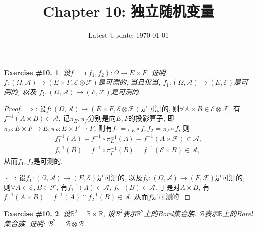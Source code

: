 \documentclass[UTF8, a4paper]{article}
\title{Chapter 10: 独立随机变量}
\author{}
\date{Latest Update: \today}
\newtheorem{exercise}{Exercise \#10.}
\begin{document}
\maketitle

\begin{framed}
\begin{exercise}
设\(f = (f_1, f_2): \Omega \to E \times F\).
证明\(f: (\Omega, \mathcal{A}) \to (E\times F, \mathcal{E}\otimes \mathcal{F})\)是可测的, 
当且仅当, \(f_1: (\Omega, \mathcal{A}) \to (E, \mathcal{E})\)是可测的, 以及
\(f_2: (\Omega, \mathcal{A}) \to (F, \mathcal{F})\)是可测的.
\end{exercise}
\end{framed}

\begin{proof}
\(\Rightarrow\): 设\(f:  (\Omega, \mathcal{A}) \to (E\times F, \mathcal{E}\otimes \mathcal{F})\)是可测的, 
则\(\forall A\times B \in \mathcal{E} \otimes \mathcal{F}\), 有\(f^{-1}(A\times B) \in \mathcal{A}\).
记\(\pi_E, \pi_F\)分别是向\(E, F\)的投影算子, 即\(\pi_E: E\times F \to E, \pi_F: E\times F \to F\), 
则有\(f_1 = \pi_E \circ f, f_2 = \pi_F \circ f\), 则
$$
\begin{gathered}
    f_1^{-1}(A) = f^{-1} \circ \pi_E^{-1}(A) = f^{-1} (A \times \mathcal{F}) \in \mathcal{A}, \\
    f_2^{-1}(B) = f^{-1} \circ \pi_F^{-1}(B) = f^{-1} (\mathcal{E} \times B) \in \mathcal{A},
\end{gathered}
$$
从而\(f_1, f_2\)是可测的.

\(\Leftarrow\): 设\(f_1: (\Omega, \mathcal{A}) \to (E, \mathcal{E})\)是可测的, 以及\(f_2: (\Omega, \mathcal{A}) \to (F, \mathcal{F})\)是可测的, 
则\(\forall A \in \mathcal{E}, B \in \mathcal{F}\), 有\(f_1^{-1}(A) \in \mathcal{A}\), \(f_2^{-1}(B) \in \mathcal{A}\).
于是对\(A \times B\), 有\(f^{-1}(A \times B) = f^{-1}(A) \cap f_2^{-1}(B) \in \mathcal{A}\), 从而\(f\)是可测的.
\end{proof}


\begin{framed}
\begin{exercise}
设\(\mathbb{R}^2 = \mathbb{R} \times \mathbb{R}\), 
设\(\mathcal{B}^2\)表示\(\mathbb{R}^2\)上的Borel集合族.
\(\mathcal{B}\)表示\(\mathbb{R}\)上的Borel集合族.
证明: \(\mathcal{B}^2 = \mathcal{B} \otimes \mathcal{B}\).
\end{exercise}
\end{framed}
\end{document}
